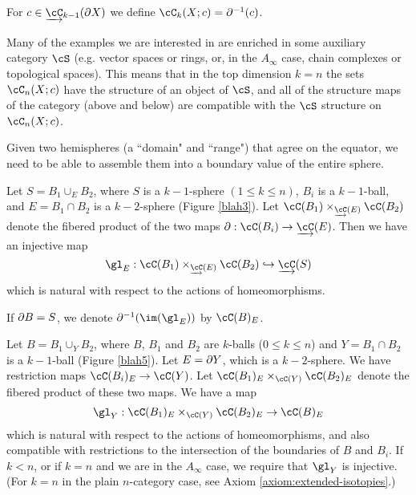 \documentclass{pnastwo}
\begin{document}
\begin{article}
For $c\in \cl{\cC}_{k-1}(\bd X)$ we define $\cC_k(X; c) = \bd^{-1}(c)$.

Many of the examples we are interested in are enriched in some auxiliary category $\cS$
(e.g. vector spaces or rings, or, in the $A_\infty$ case, chain complexes or topological spaces).
This means that in the top dimension $k=n$ the sets $\cC_n(X; c)$ have the structure
of an object of $\cS$, and all of the structure maps of the category (above and below) are
compatible with the $\cS$ structure on $\cC_n(X; c)$.


Given two hemispheres (a ``domain" and ``range") that agree on the equator, we need to be able to 
assemble them into a boundary value of the entire sphere.

\begin{lem}
\label{lem:domain-and-range}
Let $S = B_1 \cup_E B_2$, where $S$ is a $k{-}1$-sphere $(1\le k\le n)$,
$B_i$ is a $k{-}1$-ball, and $E = B_1\cap B_2$ is a $k{-}2$-sphere (Figure \ref{blah3}).
Let $\cC(B_1) \times_{\cl{\cC}(E)} \cC(B_2)$ denote the fibered product of the 
two maps $\bd: \cC(B_i)\to \cl{\cC}(E)$.
Then we have an injective map
\[
	\gl_E : \cC(B_1) \times_{\cl{\cC}(E)} \cC(B_2) \into \cl{\cC}(S)
\]
which is natural with respect to the actions of homeomorphisms.
\end{lem}

If $\partial B = S$, we denote $\bdy^{-1}(\im(\gl_E))$ by $\cC(B)_E$.

\begin{axiom}[Gluing]
\label{axiom:composition}
Let $B = B_1 \cup_Y B_2$, where $B$, $B_1$ and $B_2$ are $k$-balls ($0\le k\le n$)
and $Y = B_1\cap B_2$ is a $k{-}1$-ball (Figure \ref{blah5}).
Let $E = \partial Y$, which is a $k{-}2$-sphere.
We have restriction maps $\cC(B_i)_E \to \cC(Y)$.
Let $\cC(B_1)_E \times_{\cC(Y)} \cC(B_2)_E$ denote the fibered product of these two maps. 
We have a map
\[
	\gl_Y : \cC(B_1)_E \times_{\cC(Y)} \cC(B_2)_E \to \cC(B)_E
\]
which is natural with respect to the actions of homeomorphisms, and also compatible with restrictions
to the intersection of the boundaries of $B$ and $B_i$.
If $k < n$,
or if $k=n$ and we are in the $A_\infty$ case, 
we require that $\gl_Y$ is injective.
(For $k=n$ in the plain $n$-category case, see Axiom \ref{axiom:extended-isotopies}.)
\end{axiom}


\end{article}
\end{document}
